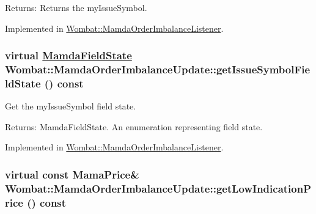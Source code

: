 \begin{Desc}
\item[Returns:]Returns the my\-Issue\-Symbol. \end{Desc}


Implemented in \hyperlink{classWombat_1_1MamdaOrderImbalanceListener_3cbc1356e4c8a1e6287aa4fd39124cbd}{Wombat::Mamda\-Order\-Imbalance\-Listener}.\hypertarget{classWombat_1_1MamdaOrderImbalanceUpdate_da309179e4a15659649e74f270e2a666}{
\subsubsection[getIssueSymbolFieldState]{\setlength{\rightskip}{0pt plus 5cm}virtual \hyperlink{namespaceWombat_93aac974f2ab713554fd12a1fa3b7d2a}{Mamda\-Field\-State} Wombat::Mamda\-Order\-Imbalance\-Update::get\-Issue\-Symbol\-Field\-State () const}}
\label{classWombat_1_1MamdaOrderImbalanceUpdate_da309179e4a15659649e74f270e2a666}


Get the my\-Issue\-Symbol field state. 

\begin{Desc}
\item[Returns:]Mamda\-Field\-State. An enumeration representing field state. \end{Desc}


Implemented in \hyperlink{classWombat_1_1MamdaOrderImbalanceListener_e65164421eb2d6835ada9d3185734021}{Wombat::Mamda\-Order\-Imbalance\-Listener}.\hypertarget{classWombat_1_1MamdaOrderImbalanceUpdate_e8ba78184cea2703611b9f16e51c3c05}{
\subsubsection[getLowIndicationPrice]{\setlength{\rightskip}{0pt plus 5cm}virtual const Mama\-Price\& Wombat::Mamda\-Order\-Imbalance\-Update::get\-Low\-Indication\-Price () const}}
\label{classWombat_1_1MamdaOrderImbalanceUpdate_e8ba78184cea2703611b9f16e51c3c05}


